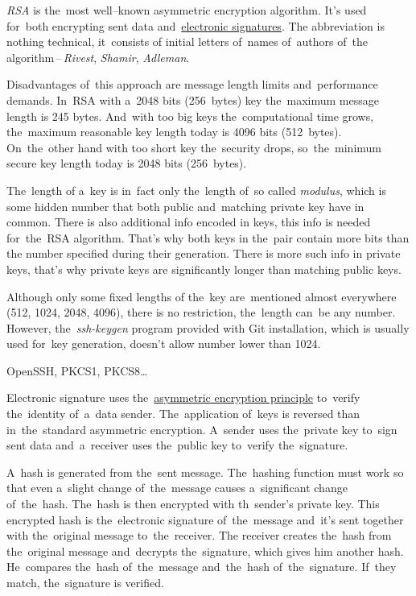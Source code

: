 \textit{RSA} is the~most well--known asymmetric encryption algorithm.
It's used for~both encrypting sent data and~\hyperref[electronicsignature]{electronic signatures}.
The abbreviation is nothing technical, it~consists of initial letters of~names of~authors of~the algorithm\,--\,\textit{Rivest}, \textit{Shamir}, \textit{Adleman}.

Disadvantages of~this approach are message length limits and~performance demands.
In~RSA with a~2048 bits (256~bytes) key the~maximum message length is 245 bytes.
And~with too big keys the~computational time grows, the~maximum reasonable key length today is 4096 bits (512~bytes).
On~the~other hand with too short key the~security drops, so~the~minimum secure key length today is 2048 bits (256~bytes).

The~length of a~key is in~fact only the~length of~so called \textit{modulus}, which is some hidden number that both public and~matching private key have in common.
There is also additional info encoded in keys, this info is needed for~the~RSA algorithm.
That's why both keys in the~pair contain more bits than the number specified during their generation.
There is more such info in private keys, that's why private keys are significantly longer than matching public keys.

\warning Although only some fixed lengths of the~key are~mentioned almost everywhere (512, 1024, 2048, 4096), there is no restriction, the~length can~be any number.
However, the~\textit{ssh-keygen} program provided with Git installation, which is usually used for~key generation, doesn't allow number lower than 1024.

\newline\todo OpenSSH, PKCS1, PKCS8\dots

\label{electronicsignature}
Electronic signature uses the~\hyperref[asymmetricencryption]{asymmetric encryption principle} to~verify the~identity of~a~data sender.
The~application of~keys is reversed than in~the~standard asymmetric encryption.
A~sender uses the~private key to~sign sent data and~a~receiver uses the~public key to~verify the~signature.

A~hash is generated from the~sent message.
The~hashing function must work so that even a~slight change of~the~message causes a~significant change of~the~hash.
The~hash is then encrypted with th~sender's private key.
This encrypted hash is the~electronic signature of~the~message and~it's sent together with the~original message to~the~receiver.
The receiver creates the~hash from the~original message and~decrypts the~signature, which gives him another hash.
He~compares the~hash of~the~message and~the~hash of~the~signature.
If~they match, the~signature is verified.

